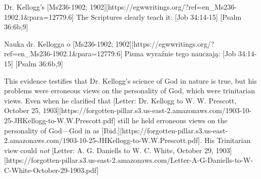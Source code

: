 Dr. Kellogg's [Ms236-1902; 1902][https://egwwritings.org/?ref=en\_Ms236-1902.1&para=12779.6] The Scriptures clearly teach it: [Job 34:14-15] [Psalm 36:6b,9]


Nauka dr. Kellogga o [Ms236-1902; 1902][https://egwwritings.org/?ref=en\_Ms236-1902.1&para=12779.6] Pisma wyraźnie tego nauczają: [Job 34:14-15] [Psalm 36:6b,9]


This evidence testifies that Dr. Kellogg's science of God in nature is true, but his problems were erroneous views on the personality of God, which were trinitarian views. Even when he clarified that [Letter: Dr. Kellogg to W. W. Prescott, October 25, 1903][https://forgotten-pillar.s3.us-east-2.amazonaws.com/1903-10-25-JHKellogg-to-W.W.Prescott.pdf] still he held erroneous views on the personality of God—God in  as [Ibid.][https://forgotten-pillar.s3.us-east-2.amazonaws.com/1903-10-25-JHKellogg-to-W.W.Prescott.pdf]. His Trinitarian view could \textit{not} [Letter: A. G. Daniells to W. C. White, October 29, 1903][https://forgotten-pillar.s3.us-east-2.amazonaws.com/Letter-A-G-Daniells-to-W-C-White-October-29-1903.pdf]


